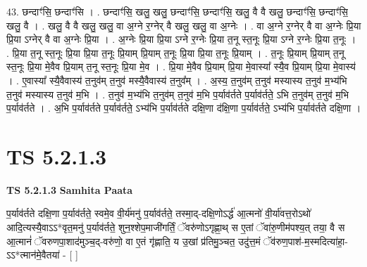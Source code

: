 \documentclass[17pt]{extarticle}
\begin{document}
43. छन्दाꣳ॑सि॒ छन्दाꣳ॑सि । . छन्दाꣳ॑सि॒ खलु॒ खलु॒ छन्दाꣳ॑सि॒ छन्दाꣳ॑सि॒ खलु॒ वै वै खलु॒ छन्दाꣳ॑सि॒ छन्दाꣳ॑सि॒ खलु॒ वै । . खलु॒ वै वै खलु॒ खलु॒ वा अ॒ग्ने र॒ग्नेर् वै खलु॒ खलु॒ वा अ॒ग्नेः । . वा अ॒ग्ने र॒ग्नेर् वै वा अ॒ग्नेः प्रि॒या प्रि॒या ऽग्नेर् वै वा अ॒ग्नेः प्रि॒या । . अ॒ग्नेः प्रि॒या प्रि॒या ऽग्ने र॒ग्नेः प्रि॒या त॒नू स्त॒नूः प्रि॒या ऽग्ने र॒ग्नेः प्रि॒या त॒नूः । . प्रि॒या त॒नू स्त॒नूः प्रि॒या प्रि॒या त॒नूः प्रि॒याम् प्रि॒याम् त॒नूः प्रि॒या प्रि॒या त॒नूः प्रि॒याम् । . त॒नूः प्रि॒याम् प्रि॒याम् त॒नू स्त॒नूः प्रि॒या मे॒वैव प्रि॒याम् त॒नू स्त॒नूः प्रि॒या मे॒व । . प्रि॒या मे॒वैव प्रि॒याम् प्रि॒या मे॒वास्या᳚ स्यै॒व प्रि॒याम् प्रि॒या मे॒वास्य॑ । . ए॒वास्या᳚ स्यै॒वैवास्य॑ त॒नुव॑म् त॒नुव॑ मस्यै॒वैवास्य॑ त॒नुव᳚म् । . अ॒स्य॒ त॒नुव॑म् त॒नुव॑ मस्यास्य त॒नुव॑ म॒भ्य॑भि त॒नुव॑ मस्यास्य त॒नुव॑ म॒भि । . त॒नुव॑ म॒भ्य॑भि त॒नुव॑म् त॒नुव॑ म॒भि प॒र्याव॑र्तते प॒र्याव॑र्तते॒ ऽभि त॒नुव॑म् त॒नुव॑ म॒भि प॒र्याव॑र्तते । . अ॒भि प॒र्याव॑र्तते प॒र्याव॑र्तते॒ ऽभ्य॑भि प॒र्याव॑र्तते दक्षि॒णा द॑क्षि॒णा प॒र्याव॑र्तते॒ ऽभ्य॑भि प॒र्याव॑र्तते दक्षि॒णा । \newline
\pagebreak
{}

\section{ TS 5.2.1.3 }

\textbf{TS 5.2.1.3 } \newline
\textbf{Samhita Paata} \newline

प॒र्याव॑र्तते दक्षि॒णा प॒र्याव॑र्तते॒ स्वमे॒व वी॒र्य॑मनु॑ प॒र्याव॑र्तते॒ तस्मा॒द्-दक्षि॒णोऽर्द्ध॑ आ॒त्मनो॑ वी॒र्या॑वत्त॒रोऽथो॑ आदि॒त्यस्यै॒वाऽऽ*वृत॒मनु॑ प॒र्याव॑र्तते॒ शुन॒श्शेप॒माजी॑गर्तिं॒ ॅवरु॑णोऽगृह्णा॒थ् स ए॒तां ॅवा॑रु॒णीम॑पश्य॒त् तया॒ वै स आ॒त्मानं॑ ॅवरुणपा॒शाद॑मुञ्च॒द्-वरु॑णो॒ वा ए॒तं गृ॑ह्णाति॒ य उ॒खां प्र॑तिमु॒ञ्चत॒ उदु॑त्त॒मं ॅव॑रुण॒पाश॑-म॒स्मदित्या॑हा॒-ऽऽ*त्मान॑मे॒वैतया॑ - [  ] \newline
\end{document}
